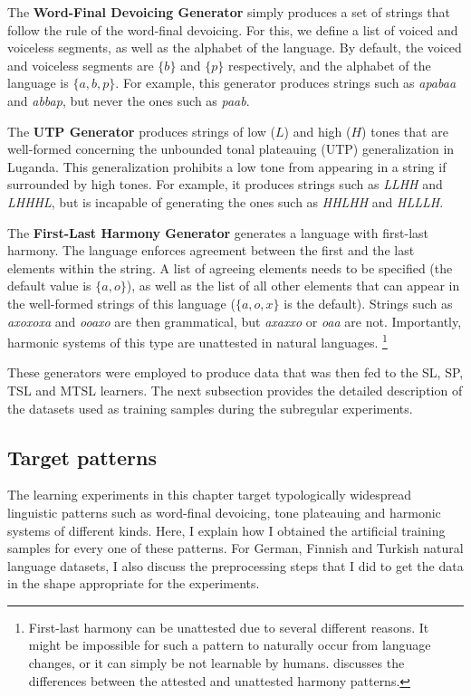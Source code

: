 The \textbf{Word-Final Devoicing Generator} simply produces a set of strings that follow the rule of the word-final devoicing.
For this, we define a list of voiced and voiceless segments, as well as the alphabet of the language.
By default, the voiced and voiceless segments are $\{b\}$ and $\{p\}$ respectively, and the alphabet of the language is $\{a, b, p\}$.
For example, this generator produces strings such as \emph{apabaa} and \emph{abbap}, but never the ones such as \emph{paab}.


The \textbf{UTP Generator} produces strings of low ($L$) and high ($H$) tones that are well-formed concerning the unbounded tonal plateauing (UTP) generalization in Luganda.
This generalization prohibits a low tone from appearing in a string if surrounded by high tones.
For example, it produces strings such as \emph{LLHH} and \emph{LHHHL}, but is incapable of generating the ones such as \emph{HHLHH} and \emph{HLLLH}.


The \textbf{First-Last Harmony Generator} generates a language with first-last harmony.
The language enforces agreement between the first and the last elements within the string.
A list of agreeing elements needs to be specified (the default value is $\{a, o\}$), as well as the list of all other elements that can appear in the well-formed strings of this language ($\{a, o, x\}$ is the default).
Strings such as \emph{axoxoxa} and \emph{ooaxo} are then grammatical, but \emph{axaxxo} or \emph{oaa} are not.
Importantly, harmonic systems of this type are unattested in natural languages.%
\footnote{First-last harmony can be unattested due to several different reasons.
It might be impossible for such a pattern to naturally occur from language changes, or it can simply be not learnable by humans.
\cite{Lai15} discusses the differences between the attested and unattested harmony patterns.}

These generators were employed to produce data that was then fed to the SL, SP, TSL and MTSL learners.
The next subsection provides the detailed description of the datasets used as training samples during the subregular experiments.


\subsection{Target patterns}

The learning experiments in this chapter target typologically widespread linguistic patterns such as word-final devoicing, tone plateauing and harmonic systems of different kinds.
Here, I explain how I obtained the artificial training samples for every one of these patterns.
For German, Finnish and Turkish natural language datasets, I also discuss the preprocessing steps that I did to get the data in the shape appropriate for the experiments.


